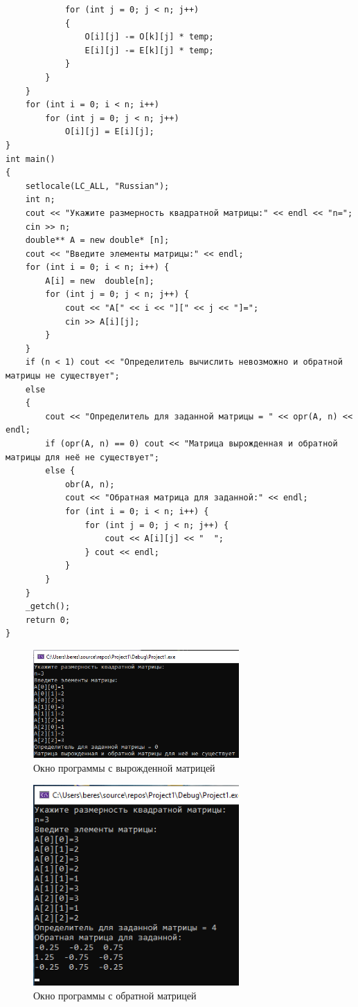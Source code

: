 \documentclass[12pt,a4paper]{scrartcl}
\begin{document}
\begin{verbatim}
            for (int j = 0; j < n; j++)
            {
                O[i][j] -= O[k][j] * temp;
                E[i][j] -= E[k][j] * temp;
            }
        }
    }
    for (int i = 0; i < n; i++)
        for (int j = 0; j < n; j++)
            O[i][j] = E[i][j];
}
int main()
{
    setlocale(LC_ALL, "Russian");
    int n;
    cout << "Укажите размерность квадратной матрицы:" << endl << "n=";
    cin >> n;
    double** A = new double* [n];
    cout << "Введите элементы матрицы:" << endl;
    for (int i = 0; i < n; i++) {
        A[i] = new  double[n];
        for (int j = 0; j < n; j++) {
            cout << "A[" << i << "][" << j << "]=";
            cin >> A[i][j];
        }
    }
    if (n < 1) cout << "Определитель вычислить невозможно и обратной матрицы не существует";
    else
    {
        cout << "Определитель для заданной матрицы = " << opr(A, n) << endl;
        if (opr(A, n) == 0) cout << "Матрица вырожденная и обратной матрицы для неё не существует";
        else {
            obr(A, n);
            cout << "Обратная матрица для заданной:" << endl;
            for (int i = 0; i < n; i++) {
                for (int j = 0; j < n; j++) {
                    cout << A[i][j] << "  ";
                } cout << endl;
            }
        }
    }
    _getch();
    return 0;
}
\end{verbatim}

\begin{figure}[!h]
	\centering
	\includegraphics[width=0.7\textwidth]{Рисунок.PNG}
	\caption{Окно программы с вырожденной матрицей}\label{fig:par}
\end{figure}
\begin{figure}[!h]
	\centering
	\includegraphics[width=0.7\textwidth]{Рисунок2.PNG}
	\caption{Окно программы с обратной матрицей}\label{fig:par}
\end{figure}
\end{document}
